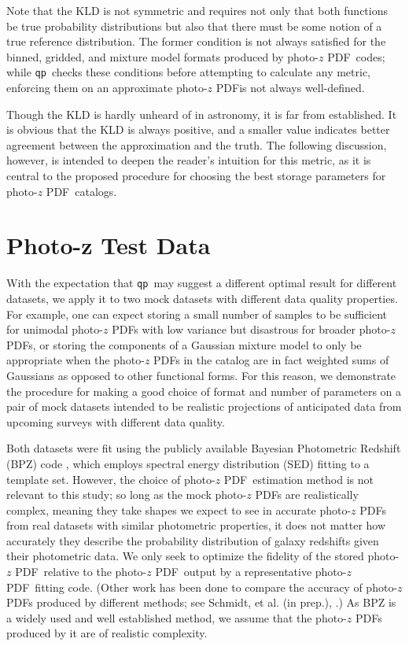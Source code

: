 \documentclass[\docopts]{\docclass}
\newcommand{\qp}{\texttt{qp}}
\newcommand{\pz}{photo-$z$ PDF}
\begin{document}
Note that the KLD is not symmetric and requires not only that both functions be 
true probability distributions but also that there must be some notion of a 
true reference distribution.  The former condition is not always satisfied for 
the binned, gridded, and mixture model formats produced by \pz\ codes; while 
\qp\ checks these conditions before attempting to calculate any metric, 
enforcing them on an approximate \pz is not always well-defined.

Though the KLD is hardly unheard of in astronomy, it is far from established.  
It is obvious that the KLD is always positive, and a smaller value indicates 
better agreement between the approximation and the truth.  The following 
discussion, however, is intended to deepen the reader's intuition for this 
metric, as it is central to the proposed procedure for choosing the best 
storage parameters for \pz\ catalogs.



\section{Photo-z Test Data}
\label{sec:data}

With the expectation that \qp\  may suggest a different optimal result for 
different datasets, we apply it to two mock datasets with different data 
quality properties.  For example, one can expect storing a small number of 
samples to be sufficient for unimodal \pz s with low variance but disastrous 
for broader \pz s, or storing the components of a Gaussian mixture model to 
only be appropriate when the \pz s in the catalog are in fact weighted sums of 
Gaussians as opposed to other functional forms.  For this reason, we 
demonstrate the procedure for making a good choice of format and number of 
parameters on a pair of mock datasets intended to be realistic projections of 
anticipated data from upcoming surveys with different data quality.

Both datasets were fit using the publicly available Bayesian Photometric 
Redshift (BPZ) code \citep{benitez_bayesian_2000}, which employs spectral 
energy distribution (SED) fitting to a template set.  However, the choice of 
\pz\ estimation method is not relevant to this study; so long as the mock \pz s 
are realistically complex, meaning they take shapes we expect to see in 
accurate \pz s from real datasets with similar photometric properties, it does 
not matter how accurately they describe the probability distribution of galaxy 
redshifts given their photometric data.  We only seek to optimize the fidelity 
of the stored \pz\ relative to the \pz\ output by a representative \pz\ fitting 
code.  (Other work has been done to compare the accuracy of \pz s produced by 
different methods; see Schmidt, et al. (in prep.), 
\citet{tanaka_photometric_2017}.)  As BPZ is a widely used and well established 
method, we assume that the \pz s produced by it are of realistic complexity.
\end{document}
